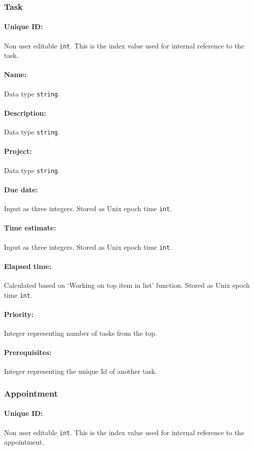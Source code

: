 \documentclass[12pt]{article}
\newcommand{\e}[1] {{\tt #1}}
\begin{document}
\subsubsection{Task} \label{sec:Task}
\paragraph{Unique ID:} Non user editable \e{int}. This is the index value used for internal reference to the task. 
\paragraph{Name:} Data type \e{string}.
\paragraph{Description:} Data type \e{string}.
\paragraph{Project:} Data type \e{string}.
\paragraph{Due date:} Input as three integers. Stored as Unix epoch time \e{int}.
\paragraph{Time estimate:} Input as three integers. Stored as Unix epoch time \e{int}.
\paragraph{Elapsed time:} Calculated based on `Working on top item in list' function. Stored as Unix epoch time \e{int}. 
\paragraph{Priority:} Integer representing number of tasks from the top.
\paragraph{Prerequisites:} Integer representing the unique Id of another task.

\subsubsection{Appointment} \label{sec:Appointment}
\paragraph{Unique ID:} Non user editable \e{int}. This is the index value used for internal reference to the appointment. 
\end{document}

